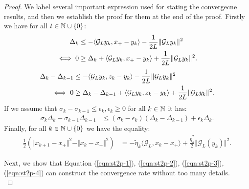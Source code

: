 \documentclass[12pt]{article}
\begin{document}
    \begin{proof}
        We label several important expression used for stating the convergecne results, and then we establish the proof for them at the end of the proof. 
        Firstly we have for all $t \in \mathbb N\cup \{0\}$: 
        \begin{align}
            \Delta_k &\le
            - \langle \mathcal G_L y_k, x_+ - y_k \rangle - \frac{1}{2L} \Vert \mathcal G_L y_k\Vert^2
            \notag
            \\
            \iff 
            0& \ge 
            \Delta_k + \langle \mathcal G_L y_k, x_+ - y_k\rangle + \frac{1}{2L}\Vert \mathcal G_L y_k\Vert^2. 
            \label{eqn:st2p-1}
        \end{align}
        \begin{align}
            \Delta_k - \Delta_{k -1} 
            &\le 
            - \langle \mathcal G_L y_k, z_k - y_k\rangle - \frac{1}{2L}\Vert \mathcal G_L y_k\Vert^2
            \notag
            \\
            \iff 
            0 &\ge
            \Delta_k - \Delta_{k - 1}
            + \langle \mathcal G_L y_k, z_k - y_k\rangle
            + \frac{1}{2L} \Vert \mathcal G_L y_k \Vert^2. 
            \label{eqn:st2p-2}
        \end{align}
        If we assume that $\sigma_k - \sigma_{k - 1} \le \epsilon_k, \epsilon_k \ge 0$ for all $k \in \mathbb N$ it has: 
        \begin{align}
            \sigma_k\Delta_k - \sigma_{k -1}\Delta_{k -1}
            &\le 
            (\sigma_k - \epsilon_k)(\Delta_k - \Delta_{k -1}) + \epsilon_k \Delta_k. 
            \label{eqn:st2p-3}
        \end{align}
        Finally, for all $k \in \mathbb N \cup \{0\}$ we have the equality: 
        \begin{align}
            \frac{1}{2}
            (
                \Vert x_{k + 1} - x_+\Vert^2 - \Vert x_k - x_+\Vert^2
            )
            &= 
            - \tilde \eta_k \langle \mathcal G_L, x_k - x_+\rangle
            + \frac{\tilde \eta_k^2}{2}\Vert \mathcal G_L(y_k)\Vert^2. 
            \label{eqn:st2p-4}
        \end{align}
        \par
        Next, we show that 
        Equation (\ref*{eqn:st2p-1}), 
        (\ref*{eqn:st2p-2}), 
        (\ref*{eqn:st2p-3}), 
        (\ref*{eqn:st2p-4}) 
        can construct the convergence rate without too many details. 
        \\

\end{proof}
\end{document}

